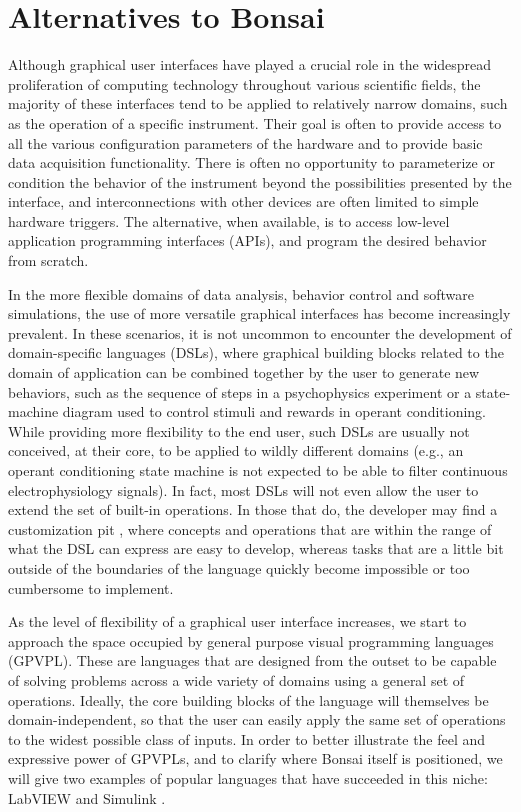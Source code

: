 \section{Alternatives to Bonsai}

Although graphical user interfaces have played a crucial role in the widespread proliferation of computing technology throughout various scientific fields, the majority of these interfaces tend to be applied to relatively narrow domains, such as the operation of a specific instrument. Their goal is often to provide access to all the various configuration parameters of the hardware and to provide basic data acquisition functionality. There is often no opportunity to parameterize or condition the behavior of the instrument beyond the possibilities presented by the interface, and interconnections with other devices are often limited to simple hardware triggers. The alternative, when available, is to access low-level application programming interfaces (APIs), and program the desired behavior from scratch.

In the more flexible domains of data analysis, behavior control and software simulations, the use of more versatile graphical interfaces has become increasingly prevalent. In these scenarios, it is not uncommon to encounter the development of domain-specific languages (DSLs), where graphical building blocks related to the domain of application can be combined together by the user to generate new behaviors, such as the sequence of steps in a psychophysics experiment or a state-machine diagram used to control stimuli and rewards in operant conditioning. While providing more flexibility to the end user, such DSLs are usually not conceived, at their core, to be applied to wildly different domains (e.g., an operant conditioning state machine is not expected to be able to filter continuous electrophysiology signals). In fact, most DSLs will not even allow the user to extend the set of built-in operations. In those that do, the developer may find a customization pit \cite{Cook2007}, where concepts and operations that are within the range of what the DSL can express are easy to develop, whereas tasks that are a little bit outside of the boundaries of the language quickly become impossible or too cumbersome to implement.

As the level of flexibility of a graphical user interface increases, we start to approach the space occupied by general purpose visual programming languages (GPVPL). These are languages that are designed from the outset to be capable of solving problems across a wide variety of domains using a general set of operations. Ideally, the core building blocks of the language will themselves be domain-independent, so that the user can easily apply the same set of operations to the widest possible class of inputs. In order to better illustrate the feel and expressive power of GPVPLs, and to clarify where Bonsai itself is positioned, we will give two examples of popular languages that have succeeded in this niche: LabVIEW \cite{Instruments2014} and Simulink \cite{MathWorks2014}.

